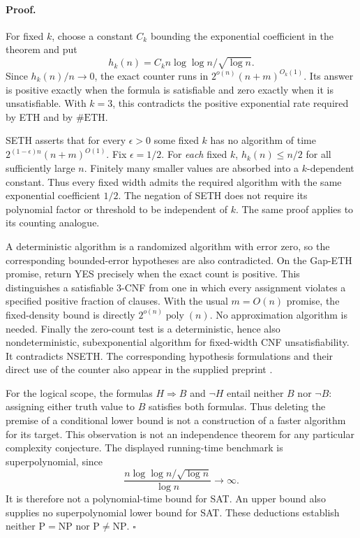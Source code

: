 \documentclass[11pt,a4paper]{article}
\begin{document}
\paragraph{Proof.}
For fixed \(k\), choose a constant \(C_k\) bounding the exponential
coefficient in the theorem and put
\[
 h_k(n)=C_k n\log\log n/\sqrt{\log n}.
\]
Since \(h_k(n)/n\longrightarrow0\), the exact counter runs in
\(2^{o(n)}(n+m)^{O_k(1)}\). Its answer is positive exactly when the
formula is satisfiable and zero exactly when it is unsatisfiable.
With \(k=3\), this contradicts the positive exponential rate required
by ETH and by \(\#\mathrm{ETH}\).

SETH asserts that for every \(\epsilon>0\) some fixed \(k\) has no
algorithm of time
\(2^{(1-\epsilon)n}(n+m)^{O(1)}\).
Fix \(\epsilon=1/2\). For \emph{each} fixed \(k\),
\(h_k(n)\leq n/2\) for all sufficiently large \(n\).
Finitely many smaller values are absorbed into a \(k\)-dependent
constant. Thus every fixed width admits the required algorithm with
the same exponential coefficient \(1/2\). The negation of SETH does
not require its polynomial factor or threshold to be independent of
\(k\). The same proof applies to its counting analogue.

A deterministic algorithm is a randomized algorithm with error zero,
so the corresponding bounded-error hypotheses are also contradicted.
On the Gap-ETH promise, return YES precisely when the exact count is
positive. This distinguishes a satisfiable 3-CNF from one in which every
assignment violates a specified positive fraction of clauses. With
the usual \(m=O(n)\) promise, the fixed-density bound is directly
\(2^{o(n)}\operatorname{poly}(n)\). No approximation algorithm is
needed. Finally the zero-count test is a deterministic, hence also
nondeterministic, subexponential algorithm for fixed-width CNF
unsatisfiability. It contradicts NSETH.
The corresponding hypothesis formulations and their direct use of the
counter also appear in the supplied preprint
\cite[\S1.1.1--\S1.1.3]{OpenAIETH}.

For the logical scope, the formulas \(H\Rightarrow B\) and \(\neg H\)
entail neither \(B\) nor \(\neg B\): assigning either truth value to
\(B\) satisfies both formulas. Thus deleting the premise of a
conditional lower bound is not a construction of a faster algorithm
for its target. This observation is not an independence theorem for
any particular complexity conjecture.
The displayed running-time benchmark is superpolynomial, since
\[
 \frac{n\log\log n/\sqrt{\log n}}{\log n}\longrightarrow\infty.
\]
It is therefore not a polynomial-time bound for SAT. An upper bound
also supplies no superpolynomial lower bound for SAT. These deductions
establish neither \(\mathrm P=\mathrm{NP}\) nor
\(\mathrm P\ne\mathrm{NP}\).
\hfill\(\square\)
\end{document}
